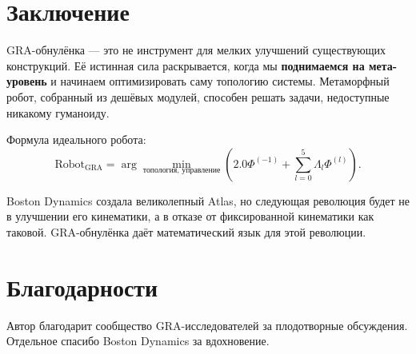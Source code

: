 \documentclass[12pt,a4paper]{article}
\begin{document}
\section{Заключение}

GRA-обнулёнка — это не инструмент для мелких улучшений существующих конструкций. Её истинная сила раскрывается, когда мы \textbf{поднимаемся на мета-уровень} и начинаем оптимизировать саму топологию системы. Метаморфный робот, собранный из дешёвых модулей, способен решать задачи, недоступные никакому гуманоиду.

Формула идеального робота:
\[
\boxed{\text{Robot}_{\text{GRA}} = \arg\min_{\text{топология, управление}} \left(2.0\Phi^{(-1)} + \sum_{l=0}^{5} \Lambda_l \Phi^{(l)}\right)}.
\]

Boston Dynamics создала великолепный Atlas, но следующая революция будет не в улучшении его кинематики, а в отказе от фиксированной кинематики как таковой. GRA-обнулёнка даёт математический язык для этой революции.

\section*{Благодарности}

Автор благодарит сообщество GRA-исследователей за плодотворные обсуждения. Отдельное спасибо Boston Dynamics за вдохновение.
\end{document}
